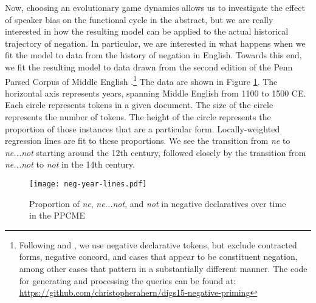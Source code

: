 \documentclass[linguex]{sp}
\theoremstyle{definition} \newtheorem{definition}{Definition}
\begin{document}
Now, choosing an evolutionary game dynamics allows us to investigate the effect of speaker bias on the functional cycle in the abstract, but we are really interested in how the resulting model can be applied to the actual historical trajectory of negation. In particular, we are interested in what happens when we fit the model to data from the history of negation in English. Towards this end, we fit the resulting model to data drawn from the second edition of the Penn Parsed Corpus of Middle English \citep{ppcme2}.\footnote{Following \cite{wallage2008} and \cite{ecay-tamminga2015}, we use negative declarative tokens, but exclude contracted forms, negative concord, and cases that appear to be constituent negation, among other cases that pattern in a substantially different manner. The code for generating and processing the queries can be found at: \url{https://github.com/christopherahern/digs15-negative-priming}} The data are shown in Figure \ref{neg-three-plot}. The horizontal axis represents years, spanning Middle English from 1100 to 1500 CE. Each circle represents tokens in a given document. The size of the circle represents the number of tokens. The height of the circle represents the proportion of those instances that are a particular form. Locally-weighted regression lines are fit to these proportions.  We see the transition from \textit{\color{red} ne} to \textit{\color{blue} ne...not} starting around the 12th century, followed closely by the transition from \textit{\color{blue} ne...not} to \textit{\color{green} not} in the 14th century. 


\begin{figure}
\centering
     \texttt{[image: neg-year-lines.pdf]}
\caption{Proportion of \textit{\color{red} ne}, \textit{\color{blue} ne...not}, and \textit{\color{green} not}  in negative declaratives over time in the PPCME}
\label{neg-three-plot}
\end{figure}
\end{document}
